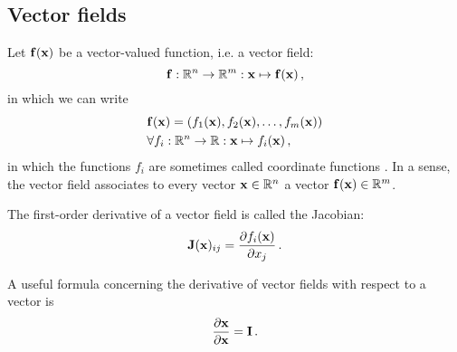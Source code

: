     \subsection{Vector fields}
        Let $\vb{f}(\vb{x})$ be a vector-valued function, i.e. a vector field:
        \begin{equation}
            \vb{f}: \mathbb{R}^n \rightarrow \mathbb{R}^m: \vb{x} \mapsto \vb{f}(\vb{x}) \thinspace ,
        \end{equation}
        in which we can write
        \begin{align} \label{eq:vector_field}
            &\vb{f}(\vb{x}) = (f_1(\vb{x}), f_2(\vb{x}), \dots, f_m(\vb{x})) \\
            &\forall f_i: \mathbb{R}^n \rightarrow \mathbb{R}: \vb{x} \mapsto f_i(\vb{x}) \thinspace ,
        \end{align}
        in which the functions $f_i$ are sometimes called coordinate functions \cite{burden2010}. In a sense, the vector field associates to every vector $\vb{x} \in \mathbb{R}^n$ a vector $\vb{f}(\vb{x}) \in \mathbb{R}^m$.

        The first-order derivative of a vector field is called the Jacobian:
        \begin{equation} \label{eq:jacobian}
            \vb{J}(\vb{x})_{ij} = \pdv{f_i(\vb{x})}{x_j} \thinspace .
        \end{equation}

        A useful formula concerning the derivative of vector fields with respect to a vector is
        \begin{align}
            \pdv{\vb{x}}{\vb{x}} = \vb{I} \thinspace .
        \end{align}
